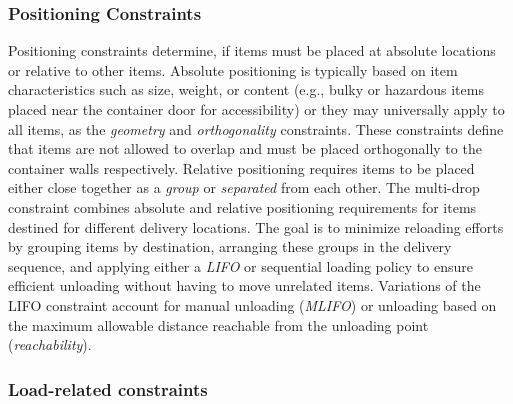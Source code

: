 \subsubsection{Positioning Constraints}

Positioning constraints determine, if items must be placed at
absolute locations or relative to other items. Absolute positioning is
typically based on item characteristics such as size, weight, or
content (e.g., bulky or hazardous items placed near the container door for accessibility) or
they may universally apply to all items, as the \textit{geometry} and
\textit{orthogonality} constraints. These constraints define that items are not allowed to overlap
and must be placed orthogonally to the container walls respectively.
Relative positioning requires items to be placed either close together as a \textit{group} or
\textit{separated} from each other.
The multi-drop constraint combines absolute and relative positioning requirements for items
destined for different delivery locations. The goal is to minimize reloading efforts by grouping items
by destination, arranging these groups in the delivery sequence, and applying either a \textit{\gls{LIFO}}
or sequential loading policy to ensure efficient unloading without having to move unrelated items.
Variations of the \gls{LIFO} constraint account for manual unloading (\textit{\gls{MLIFO}}) or unloading based on the
maximum allowable distance reachable from the unloading point (\textit{reachability}).

\subsubsection{Load-related constraints}

